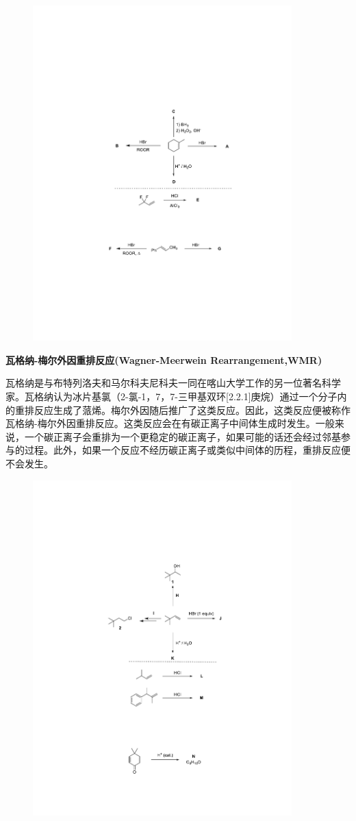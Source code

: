 \begin{figure}[h]
	\centering
	\includegraphics[width=10cm]{./pic/t4-3.pdf}
\end{figure}

\noindent\textbf{瓦格纳-梅尔外因重排反应(Wagner-Meerwein Rearrangement,WMR)}

瓦格纳是与布特列洛夫和马尔科夫尼科夫一同在喀山大学工作的另一位著名科学家。瓦格纳认为冰片基氯（2-氯-1，7，7-三甲基双环{[}2.2.1{]}庚烷）通过一个分子内的重排反应生成了蒎烯。梅尔外因随后推广了这类反应。因此，这类反应便被称作瓦格纳-梅尔外因重排反应。这类反应会在有碳正离子中间体生成时发生。一般来说，一个碳正离子会重排为一个更稳定的碳正离子，如果可能的话还会经过邻基参与的过程。此外，如果一个反应不经历碳正离子或类似中间体的历程，重排反应便不会发生。

\begin{figure}[h!]
	\centering
	\includegraphics[width=10cm]{./pic/t4-4.pdf}
\end{figure}

